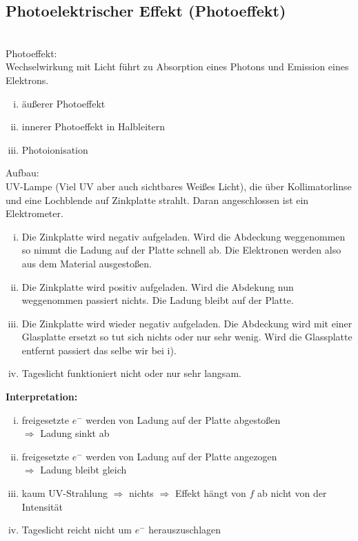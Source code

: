 \subsection{Photoelektrischer Effekt (Photoeffekt)}
\\
Photoeffekt:\\
Wechselwirkung mit Licht führt zu Absorption eines Photons und Emission eines Elektrons.
\begin{enumerate}[i)]
	\item äußerer Photoeffekt
	\item innerer Photoeffekt in Halbleitern
	\item Photoionisation
\end{enumerate}
Aufbau:\\
UV-Lampe (Viel UV aber auch sichtbares Weißes Licht), die über Kollimatorlinse und eine Lochblende auf Zinkplatte strahlt. Daran angeschlossen ist ein Elektrometer.
\begin{enumerate}[i)]
	\item Die Zinkplatte wird negativ aufgeladen. Wird die Abdeckung weggenommen so nimmt die Ladung auf der Platte schnell ab. Die Elektronen werden also aus dem Material ausgestoßen.
	\item Die Zinkplatte wird positiv aufgeladen. Wird die Abdekung nun weggenommen passiert nichts. Die Ladung bleibt auf der Platte.
	\item Die Zinkplatte wird wieder negativ aufgeladen. Die Abdeckung wird mit einer Glasplatte ersetzt so tut sich nichts oder nur sehr wenig. Wird die Glassplatte entfernt passiert das selbe wir bei i).
	\item Tageslicht funktioniert nicht oder nur sehr langsam.
\end{enumerate}
\textbf{Interpretation:}
\begin{enumerate}[i)]
	\item freigesetzte $ e^- $ werden von Ladung auf der Platte abgestoßen\\
	$ \Rightarrow $ Ladung sinkt ab
	\item freigesetzte $ e^- $ werden von Ladung auf der Platte angezogen\\
	$ \Rightarrow $ Ladung bleibt gleich
	\item kaum UV-Strahlung $ \Rightarrow $ nichts $ \Rightarrow $ Effekt hängt von $ f $ ab nicht von der Intensität
	\item Tageslicht reicht nicht um $ e^- $ herauszuschlagen
\end{enumerate}
